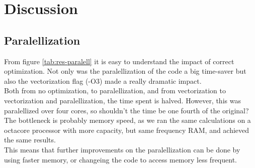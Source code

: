\documentclass[../main.tex]{subfiles}
\begin{document}
\section{Discussion}
\subsection{Paralellization}
From figure \ref{tab:res-paralell} it is easy to understand the impact of correct optimization. Not only was the paralellization of the code a big time-saver but also the vectorization flag (-O3) made a really dramatic impact.\\

Both from no optimization, to paralellization, and from vectorization to vectorization and paralellization, the time spent is halved. However, this was paralellized over four cores, so shouldn't the time be one fourth of the original? The bottleneck is probably memory speed, as we ran the same calculations on a octacore processor with more capacity, but same frequency RAM, and achieved the same results.\\

This means that further improvements on the paralellization can be done by using faster memory, or changeing the code to access memory less frequent.
\end{document}
